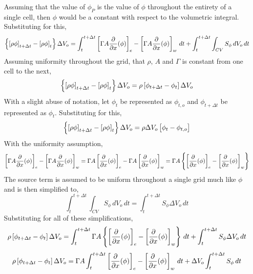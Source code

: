 \documentclass[class=report, 12pt, crop=false]{standalone}
\begin{document}
\begin{center}
Assuming that the value of $\phi_P$ is the value of $\phi$ throughout the entirety of a single cell, then $\phi$ would be a constant with respect to the volumetric integral. Substituting for this,
$$\left\{\left[\rho \phi\right]_{t+\Delta t} - \left[\rho \phi\right]_{t}\right\}\Delta V_o = \int^{t+\Delta t}_{t}\left[\Gamma A\frac{\partial}{\partial x}(\phi)\right]_{e} - \left[\Gamma A\frac{\partial}{\partial x}(\phi)\right]_{w}\,dt + \int^{t+\Delta t}_{t}\int_{CV}S_\phi\,dV_o\,dt$$
Assuming uniformity throughout the grid, that $\rho$, $A$ and $\Gamma$ is constant from one cell to the next,
$$\left\{\left[\rho \phi\right]_{t+\Delta t} - \left[\rho \phi\right]_{t}\right\}\Delta V_o = \rho \left[\phi_{t+\Delta t} - \phi_{t}\right]\Delta V_o$$
With a slight abuse of notation, let $\phi_{t}$ be represented as $\phi_{t,o}$ and $\phi_{t+\Delta t}$ be represented as $\phi_{t}$. Substituting for this,
$$\left\{\left[\rho \phi\right]_{t+\Delta t} - \left[\rho \phi\right]_{t}\right\}\Delta V_o = \rho\Delta V_o \left[\phi_{t} - \phi_{t,o}\right]$$
With the uniformity assumption,
$$\left[\Gamma A\frac{\partial}{\partial x}(\phi)\right]_{e} - \left[\Gamma A\frac{\partial}{\partial x}(\phi)\right]_{w} = \Gamma A\left[\frac{\partial}{\partial x}(\phi)\right]_{e} - \Gamma A\left[\frac{\partial}{\partial x}(\phi)\right]_{w} = \Gamma A\left\{\left[\frac{\partial}{\partial x}(\phi)\right]_{e} - \left[\frac{\partial}{\partial x}(\phi)\right]_{w}\right\}$$
The source term is assumed to be uniform throughout a single grid much like $\phi$ and is then simplified to,
$$\int^{t+\Delta t}_{t}\int_{CV}S_\phi\,dV_o\,dt = \int^{t+\Delta t}_{t} S_\phi\Delta V_o\,dt$$
Substituting for all of these simplifications,
$$\rho \left[\phi_{t+\Delta t} - \phi_{t}\right]\Delta V_o = \int^{t+\Delta t}_{t}\Gamma A\left\{\left[\frac{\partial}{\partial x}(\phi)\right]_{e} - \left[\frac{\partial}{\partial x}(\phi)\right]_{w}\right\}\,dt + \int^{t+\Delta t}_{t} S_\phi\Delta V_o\,dt$$
$$\rho \left[\phi_{t+\Delta t} - \phi_{t}\right]\Delta V_o = \Gamma A\int^{t+\Delta t}_{t}\left[\frac{\partial}{\partial x}(\phi)\right]_{e} - \left[\frac{\partial}{\partial x}(\phi)\right]_{w}\,dt + \Delta V_o\int^{t+\Delta t}_{t} S_\phi\,dt$$

\end{center}
\end{document}

